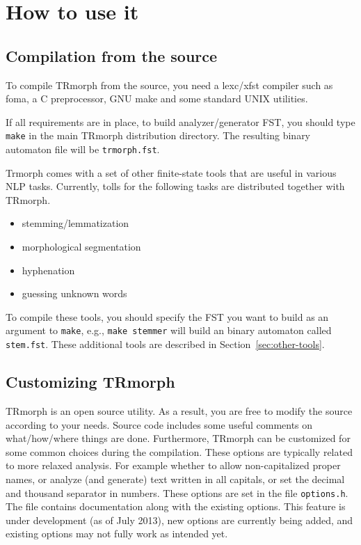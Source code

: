 \documentclass[twocolumn]{article}
\begin{document}
\section{How to use it}

\subsection{Compilation from the source}

To compile TRmorph from the source, you need a lexc/xfst compiler such
as foma, a C preprocessor, GNU make and some standard UNIX utilities.

If all requirements are in place, to build analyzer/generator FST, 
you should type \lstinline{make} in the main TRmorph distribution directory. 
The resulting binary automaton file will be \lstinline{trmorph.fst}.

Trmorph comes with a set of other finite-state tools that are useful
in various NLP tasks. Currently, tolls for the following tasks are
distributed together with TRmorph.
\begin{itemize}\addtolength{\itemsep}{-0.5\baselineskip}
\item stemming/lemmatization
\item morphological segmentation
\item hyphenation
\item guessing unknown words
\end{itemize}

To compile these tools, you should specify the FST you want to
build as an argument to \lstinline{make}, e.g., 
\lstinline{make stemmer} 
will build an binary automaton called \lstinline{stem.fst}.
These additional tools are described in Section~\ref{sec:other-tools}.

\subsection{Customizing TRmorph}

TRmorph is an open source utility. As a result, you are free to modify
the source according to your needs. Source code includes some useful
comments on what/how/where things are done. Furthermore, TRmorph can
be customized for some common choices during the compilation. These
options are typically related to more relaxed analysis. For example
whether to allow non-capitalized proper names, or analyze (and
generate) text written in all capitals, or set the decimal and
thousand separator in numbers. These options are set in the file
\lstinline{options.h}. The file contains documentation along with the
existing options. This feature is under development (as of July 2013),
new options are currently being added, and existing options may not
fully work as intended yet.
\end{document}
